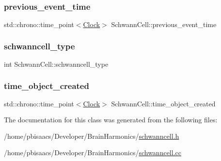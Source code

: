 \subsubsection{\texorpdfstring{previous\+\_\+event\+\_\+time}{previous\_event\_time}}
{\footnotesize\ttfamily std\+::chrono\+::time\+\_\+point$<$\mbox{\hyperlink{universe_8h_a0ef8d951d1ca5ab3cfaf7ab4c7a6fd80}{Clock}}$>$ Schwann\+Cell\+::previous\+\_\+event\+\_\+time\hspace{0.3cm}{\ttfamily [private]}}

\mbox{\label{classSchwannCell_a6b045b7f7bf629cd9f75b58c40f5b7c1}} 
\subsubsection{\texorpdfstring{schwanncell\+\_\+type}{schwanncell\_type}}
{\footnotesize\ttfamily int Schwann\+Cell\+::schwanncell\+\_\+type\hspace{0.3cm}{\ttfamily [private]}}

\mbox{\label{classSchwannCell_ac5c518c34e3c2afb70bc2780c1b74439}} 
\subsubsection{\texorpdfstring{time\+\_\+object\+\_\+created}{time\_object\_created}}
{\footnotesize\ttfamily std\+::chrono\+::time\+\_\+point$<$\mbox{\hyperlink{universe_8h_a0ef8d951d1ca5ab3cfaf7ab4c7a6fd80}{Clock}}$>$ Schwann\+Cell\+::time\+\_\+object\+\_\+created\hspace{0.3cm}{\ttfamily [private]}}



The documentation for this class was generated from the following files\+:\begin{DoxyCompactItemize}
\item 
/home/pbisaacs/\+Developer/\+Brain\+Harmonics/\mbox{\hyperlink{schwanncell_8h}{schwanncell.\+h}}\item 
/home/pbisaacs/\+Developer/\+Brain\+Harmonics/\mbox{\hyperlink{schwanncell_8cc}{schwanncell.\+cc}}\end{DoxyCompactItemize}
